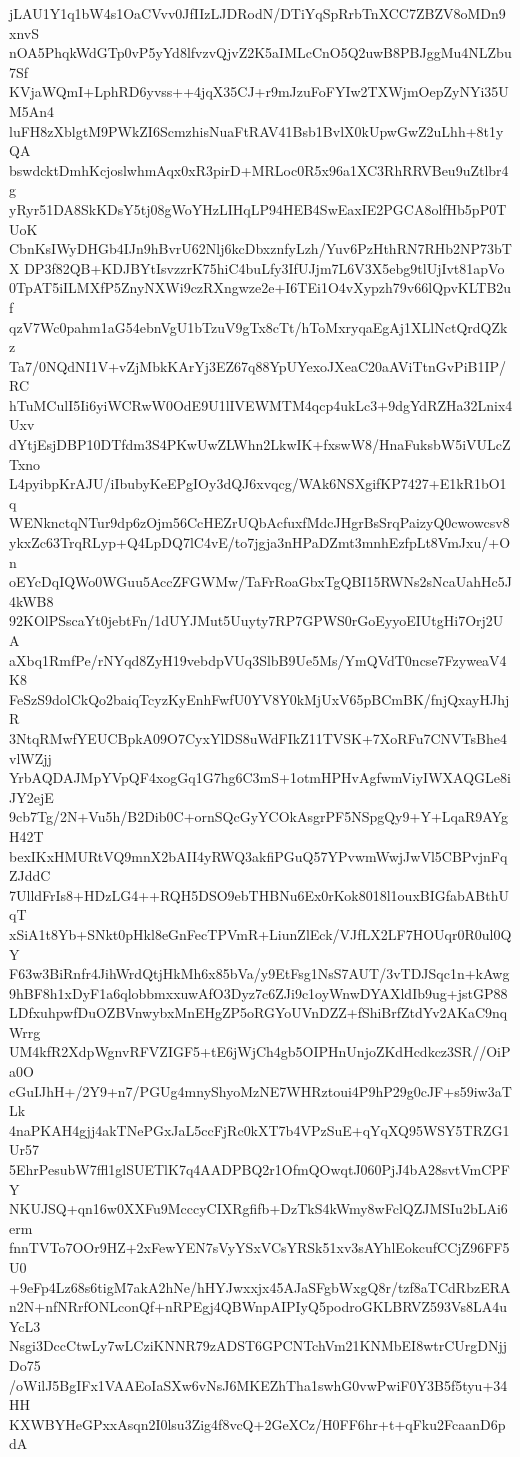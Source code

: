 jLAU1Y1q1bW4s1OaCVvv0JfIIzLJDRodN/DTiYqSpRrbTnXCC7ZBZV8oMDn9xnvS
nOA5PhqkWdGTp0vP5yYd8lfvzvQjvZ2K5aIMLcCnO5Q2uwB8PBJggMu4NLZbu7Sf
KVjaWQmI+LphRD6yvss++4jqX35CJ+r9mJzuFoFYIw2TXWjmOepZyNYi35UM5An4
luFH8zXblgtM9PWkZI6ScmzhisNuaFtRAV41Bsb1BvlX0kUpwGwZ2uLhh+8t1yQA
bswdcktDmhKcjoslwhmAqx0xR3pirD+MRLoc0R5x96a1XC3RhRRVBeu9uZtlbr4g
yRyr51DA8SkKDsY5tj08gWoYHzLIHqLP94HEB4SwEaxIE2PGCA8olfHb5pP0TUoK
CbnKsIWyDHGb4IJn9hBvrU62Nlj6kcDbxznfyLzh/Yuv6PzHthRN7RHb2NP73bTX
DP3f82QB+KDJBYtIsvzzrK75hiC4buLfy3IfUJjm7L6V3X5ebg9tlUjIvt81apVo
0TpAT5iILMXfP5ZnyNXWi9czRXngwze2e+I6TEi1O4vXypzh79v66lQpvKLTB2uf
qzV7Wc0pahm1aG54ebnVgU1bTzuV9gTx8cTt/hToMxryqaEgAj1XLlNctQrdQZkz
Ta7/0NQdNI1V+vZjMbkKArYj3EZ67q88YpUYexoJXeaC20aAViTtnGvPiB1IP/RC
hTuMCulI5Ii6yiWCRwW0OdE9U1lIVEWMTM4qcp4ukLc3+9dgYdRZHa32Lnix4Uxv
dYtjEsjDBP10DTfdm3S4PKwUwZLWhn2LkwIK+fxswW8/HnaFuksbW5iVULcZTxno
L4pyibpKrAJU/iIbubyKeEPgIOy3dQJ6xvqcg/WAk6NSXgifKP7427+E1kR1bO1q
WENknctqNTur9dp6zOjm56CcHEZrUQbAcfuxfMdcJHgrBsSrqPaizyQ0cwowcsv8
ykxZc63TrqRLyp+Q4LpDQ7lC4vE/to7jgja3nHPaDZmt3mnhEzfpLt8VmJxu/+On
oEYcDqIQWo0WGuu5AccZFGWMw/TaFrRoaGbxTgQBI15RWNs2sNcaUahHc5J4kWB8
92KOlPSscaYt0jebtFn/1dUYJMut5Uuyty7RP7GPWS0rGoEyyoEIUtgHi7Orj2UA
aXbq1RmfPe/rNYqd8ZyH19vebdpVUq3SlbB9Ue5Ms/YmQVdT0ncse7FzyweaV4K8
FeSzS9dolCkQo2baiqTcyzKyEnhFwfU0YV8Y0kMjUxV65pBCmBK/fnjQxayHJhjR
3NtqRMwfYEUCBpkA09O7CyxYlDS8uWdFIkZ11TVSK+7XoRFu7CNVTsBhe4vlWZjj
YrbAQDAJMpYVpQF4xogGq1G7hg6C3mS+1otmHPHvAgfwmViyIWXAQGLe8iJY2ejE
9cb7Tg/2N+Vu5h/B2Dib0C+ornSQcGyYCOkAsgrPF5NSpgQy9+Y+LqaR9AYgH42T
bexIKxHMURtVQ9mnX2bAII4yRWQ3akfiPGuQ57YPvwmWwjJwVl5CBPvjnFqZJddC
7UlldFrIs8+HDzLG4++RQH5DSO9ebTHBNu6Ex0rKok8018l1ouxBIGfabABthUqT
xSiA1t8Yb+SNkt0pHkl8eGnFecTPVmR+LiunZlEck/VJfLX2LF7HOUqr0R0ul0QY
F63w3BiRnfr4JihWrdQtjHkMh6x85bVa/y9EtFsg1NsS7AUT/3vTDJSqc1n+kAwg
9hBF8h1xDyF1a6qlobbmxxuwAfO3Dyz7c6ZJi9c1oyWnwDYAXldIb9ug+jstGP88
LDfxuhpwfDuOZBVnwybxMnEHgZP5oRGYoUVnDZZ+fShiBrfZtdYv2AKaC9nqWrrg
UM4kfR2XdpWgnvRFVZIGF5+tE6jWjCh4gb5OIPHnUnjoZKdHcdkcz3SR//OiPa0O
cGuIJhH+/2Y9+n7/PGUg4mnyShyoMzNE7WHRztoui4P9hP29g0cJF+s59iw3aTLk
4naPKAH4gjj4akTNePGxJaL5ccFjRc0kXT7b4VPzSuE+qYqXQ95WSY5TRZG1Ur57
5EhrPesubW7ffl1glSUETlK7q4AADPBQ2r1OfmQOwqtJ060PjJ4bA28svtVmCPFY
NKUJSQ+qn16w0XXFu9McccyCIXRgfifb+DzTkS4kWmy8wFclQZJMSIu2bLAi6erm
fnnTVTo7OOr9HZ+2xFewYEN7sVyYSxVCsYRSk51xv3sAYhlEokcufCCjZ96FF5U0
+9eFp4Lz68s6tigM7akA2hNe/hHYJwxxjx45AJaSFgbWxgQ8r/tzf8aTCdRbzERA
n2N+nfNRrfONLconQf+nRPEgj4QBWnpAIPIyQ5podroGKLBRVZ593Vs8LA4uYcL3
Nsgi3DccCtwLy7wLCziKNNR79zADST6GPCNTchVm21KNMbEI8wtrCUrgDNjjDo75
/oWilJ5BgIFx1VAAEoIaSXw6vNsJ6MKEZhTha1swhG0vwPwiF0Y3B5f5tyu+34HH
KXWBYHeGPxxAsqn2I0lsu3Zig4f8vcQ+2GeXCz/H0FF6hr+t+qFku2FcaanD6pdA
